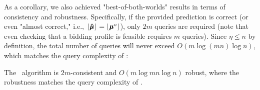As a corollary, we also achieved "best-of-both-worlds" results in terms of consistency and robustness. Specifically, if the provided prediction is correct (or even "almost correct," i.e., $\lfloor\mathbf{\hat{\pmb{\mu}}}\rfloor = \lfloor\mathbf{\pmb{\mu}}^o\rfloor$), only $2m$ queries are required (note that even checking that a bidding profile is feasible requires $m$ queries).
Since $\eta \leq n$ by definition, the total number of queries will never exceed $O(m \log (mn) \log n)$, which matches the query complexity of \mom:
\begin{corollary}
The \bmom\ algorithm is $2m$-consistent and $O(m \log mn \log n)$ robust, where the robustness matches the query complexity of \mom.
\end{corollary}